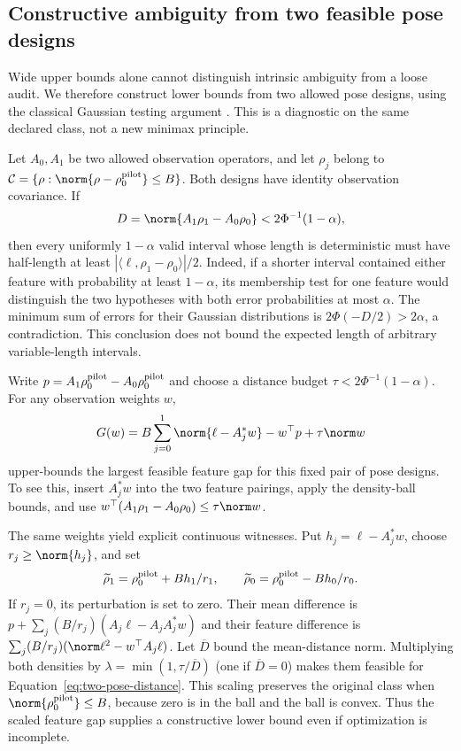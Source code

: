 \subsection{Constructive ambiguity from two feasible pose designs}
Wide upper bounds alone cannot distinguish intrinsic ambiguity from a loose
audit. We therefore construct lower bounds from two allowed pose designs,
using the classical Gaussian testing argument \citep{donoho1994}. This is a
diagnostic on the same declared class, not a new minimax principle.

Let $A_0,A_1$ be two allowed observation operators, and let
$\rho_j$ belong to $\mathcal C=\{\rho:\norm{\rho-\rho_0^{\rm pilot}}\le B\}$.
Both designs have identity observation covariance. If
\begin{equation}
 D=\norm{A_1\rho_1-A_0\rho_0}<2\Phi^{-1}(1-\alpha),
 \label{eq:two-pose-distance}
\end{equation}
then every uniformly $1-\alpha$ valid interval whose length is deterministic
must have half-length at least
$|\langle\ell,\rho_1-\rho_0\rangle|/2$. Indeed, if a shorter interval
contained either feature with probability at least $1-\alpha$, its membership
test for one feature would distinguish the two hypotheses with both error
probabilities at most $\alpha$. The minimum sum of errors for their Gaussian
distributions is $2\Phi(-D/2)>2\alpha$, a contradiction. This conclusion does
not bound the expected length of arbitrary variable-length intervals.

Write $p=A_1\rho_0^{\rm pilot}-A_0\rho_0^{\rm pilot}$ and choose a distance
budget $\tau<2\Phi^{-1}(1-\alpha)$. For any observation weights $w$,
\begin{equation}
 G(w)=B\sum_{j=0}^1\norm{\ell-A_j^*w}-w^\top p+\tau\norm w
 \label{eq:two-pose-dual}
\end{equation}
upper-bounds the largest feasible feature gap for this fixed pair of pose
designs. To see this, insert $A_j^*w$ into the two feature pairings, apply
the density-ball bounds, and use
$w^\top(A_1\rho_1-A_0\rho_0)\le\tau\norm w$.

The same weights yield explicit continuous witnesses. Put
$h_j=\ell-A_j^*w$, choose $r_j\ge\norm{h_j}$, and set
\begin{equation}
 \widetilde\rho_1=\rho_0^{\rm pilot}+Bh_1/r_1,\qquad
 \widetilde\rho_0=\rho_0^{\rm pilot}-Bh_0/r_0.
\end{equation}
If $r_j=0$, its perturbation is set to zero. Their mean difference is
$p+\sum_j(B/r_j)(A_j\ell-A_jA_j^*w)$ and their feature difference is
$\sum_j(B/r_j)(\norm\ell^2-w^\top A_j\ell)$. Let $\overline D$ bound the
mean-distance norm. Multiplying both densities by
$\lambda=\min(1,\tau/\overline D)$ (one if $\overline D=0$) makes them feasible for
Equation~\eqref{eq:two-pose-distance}. This scaling preserves the original
class when $\norm{\rho_0^{\rm pilot}}\le B$, because zero is in the ball
and the ball is convex. Thus the scaled feature gap supplies a constructive
lower bound even if optimization is incomplete.

